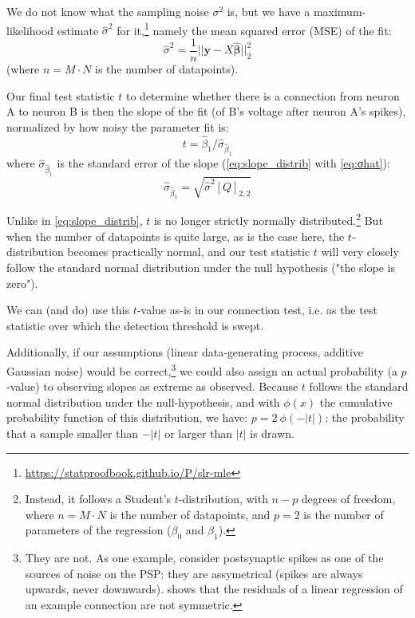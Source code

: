 We do not know what the sampling noise $σ^2$ is, but we have a maximum-likelihood estimate $\hat{σ}^2$ for it,\footnote{\url{https://statproofbook.github.io/P/slr-mle}} namely the mean squared error (MSE) of the fit:
\begin{equation}\label{eq:σhat}
    \hat{σ}^2 = \frac{1}{n} || \bm{y} - X \bm{\hat{β}} ||_2^2
\end{equation}
(where $n = M · N$ is the number of datapoints).

Our final test statistic $t$ to determine whether there is a connection from neuron A
to neuron B is then the slope of the fit (of B's voltage after neuron A's spikes), normalized by how noisy the parameter fit is:
\begin{equation} \label{eq:linreg-tstat}
    t = \hat{β}_1 / \hat{σ}_{\hat{β}_1}
\end{equation}
where $\hat{σ}_{\hat{β}_1}$ is the standard error of the slope (\cref{eq:slope_distrib} with \cref{eq:σhat}):
\begin{equation} \label{eq:linreg-stderr-β}
    \hat{σ}_{\hat{β}_1} = \sqrt{\hat{σ}^2 [Q]_{2,2}}
\end{equation}

Unlike in \cref{eq:slope_distrib}, $t$ is no longer strictly normally distributed.\footnote{
    Instead, it follows a Student's $t$-distribution, with $n - p$ degrees of freedom, where $n = M · N$ is the number of datapoints, and $p = 2$ is the number of parameters of the regression ($β_0$ and $β_1$).
}
But when the number of datapoints is quite large, as is the case here, the $t$-distribution becomes practically normal, and our test statistic $t$ will very closely follow the standard normal distribution under the null hypothesis ("the slope is zero").

We can (and do) use this $t$-value as-is in our connection test, i.e. as the test statistic over which the detection threshold is swept.

Additionally, if our assumptions (linear data-generating process, additive Gaussian noise) would be correct,\footnote{They are not. As one example, consider postsynaptic spikes as one of the sources of noise on the PSP: they are assymetrical (spikes are always upwards, never downwards).  shows that the residuals of a linear regression of an example connection are not symmetric.}
we could also assign an actual probability (a $p$-value) to observing slopes as extreme as observed. Because $t$ follows the standard normal distribution under the null-hypothesis, and with $\phi(x)$ the cumulative probability function of this distribution, we have: $p = 2\ \phi(-|t|)$: the probability that a sample smaller than $-|t|$ or larger than $|t|$ is drawn.

